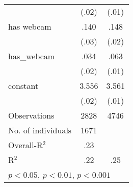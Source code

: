\begin{table}[htbp]
\begin{tabular}{l*{2}{c}}
                    &       (.02)         &       (.01)         \\
has webcam          &        .140\sym{***}&        .148\sym{***}\\
                    &       (.03)         &       (.02)         \\
has\_webcam          &        .034         &        .063\sym{***}\\
                    &       (.02)         &       (.01)         \\
constant            &       3.556\sym{***}&       3.561\sym{***}\\
                    &       (.02)         &       (.01)         \\
\hline
Observations        &        2828         &        4746         \\
No. of individuals  &        1671         &                     \\
Overall-R$^2$       &         .23         &                     \\
R$^2$               &         .22         &         .25         \\
\hline\hline
\multicolumn{3}{l}{\footnotesize \sym{*} \(p<0.05\), \sym{**} \(p<0.01\), \sym{***} \(p<0.001\)}\\
\end{tabular}
\end{table}
